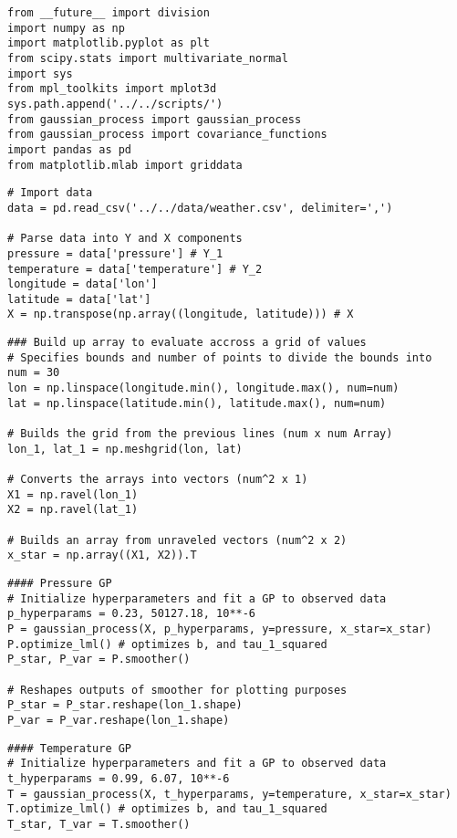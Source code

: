 \documentclass[10pt]{article}
\begin{document}
\begin{enumerate}[label=(\Alph*)]
        \begin{lstlisting}
from __future__ import division
import numpy as np 
import matplotlib.pyplot as plt
from scipy.stats import multivariate_normal
import sys
from mpl_toolkits import mplot3d
sys.path.append('../../scripts/')
from gaussian_process import gaussian_process
from gaussian_process import covariance_functions
import pandas as pd
from matplotlib.mlab import griddata
        \end{lstlisting}

        \begin{lstlisting}
# Import data
data = pd.read_csv('../../data/weather.csv', delimiter=',')

# Parse data into Y and X components
pressure = data['pressure'] # Y_1
temperature = data['temperature'] # Y_2
longitude = data['lon']
latitude = data['lat']
X = np.transpose(np.array((longitude, latitude))) # X
        \end{lstlisting}

        \begin{lstlisting}
### Build up array to evaluate accross a grid of values
# Specifies bounds and number of points to divide the bounds into
num = 30
lon = np.linspace(longitude.min(), longitude.max(), num=num)
lat = np.linspace(latitude.min(), latitude.max(), num=num)

# Builds the grid from the previous lines (num x num Array)
lon_1, lat_1 = np.meshgrid(lon, lat)

# Converts the arrays into vectors (num^2 x 1)
X1 = np.ravel(lon_1)
X2 = np.ravel(lat_1)

# Builds an array from unraveled vectors (num^2 x 2)
x_star = np.array((X1, X2)).T
        \end{lstlisting}

        \begin{lstlisting}
#### Pressure GP
# Initialize hyperparameters and fit a GP to observed data 
p_hyperparams = 0.23, 50127.18, 10**-6
P = gaussian_process(X, p_hyperparams, y=pressure, x_star=x_star)
P.optimize_lml() # optimizes b, and tau_1_squared
P_star, P_var = P.smoother()

# Reshapes outputs of smoother for plotting purposes
P_star = P_star.reshape(lon_1.shape)
P_var = P_var.reshape(lon_1.shape)
        \end{lstlisting}

        \begin{lstlisting}
#### Temperature GP
# Initialize hyperparameters and fit a GP to observed data 
t_hyperparams = 0.99, 6.07, 10**-6
T = gaussian_process(X, t_hyperparams, y=temperature, x_star=x_star)
T.optimize_lml() # optimizes b, and tau_1_squared
T_star, T_var = T.smoother()


\end{lstlisting}
\end{enumerate}
\end{document}
